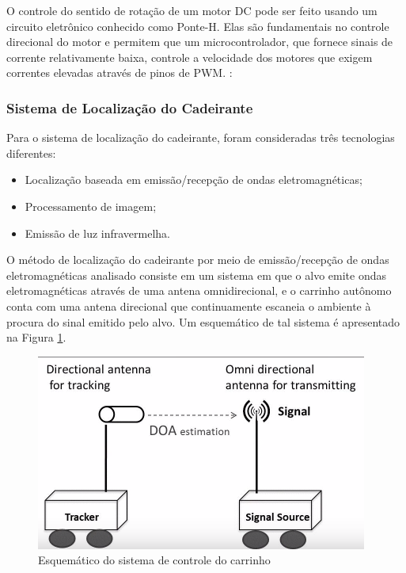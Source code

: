 \par O controle do sentido de rotação de um motor DC pode ser feito usando um circuito eletrônico conhecido como Ponte-H. Elas são fundamentais no controle direcional do motor e permitem que um microcontrolador, que fornece sinais de corrente relativamente baixa, controle a velocidade dos motores que exigem correntes elevadas através de pinos de PWM. \cite{newtoncbraga}: 

\subsubsection{Sistema de Localização do Cadeirante}

\par Para o sistema de localização do cadeirante, foram consideradas três tecnologias diferentes:

\begin{itemize}  
\item Localização baseada em emissão/recepção de ondas eletromagnéticas;
\item Processamento de imagem;
\item Emissão de luz infravermelha.
\end{itemize}

\par O método de localização do cadeirante por meio de emissão/recepção de ondas eletromagnéticas analisado \cite{min2015active} consiste em um sistema em que o alvo emite ondas eletromagnéticas através de uma antena omnidirecional,  
e o carrinho autônomo conta com uma antena direcional que continuamente escaneia o ambiente à procura do sinal emitido pelo alvo. Um esquemático de tal sistema é apresentado na Figura \ref{fig:antenaElectroMagWave}. 

\newpage

\begin{figure}[ht]
		\centering
		\includegraphics[width=.5\textwidth]{figuras/antenaElectroMagWave.png}
		\caption{Esquemático do sistema de controle do carrinho}
		\label{fig:antenaElectroMagWave}
	\end{figure} 
    
